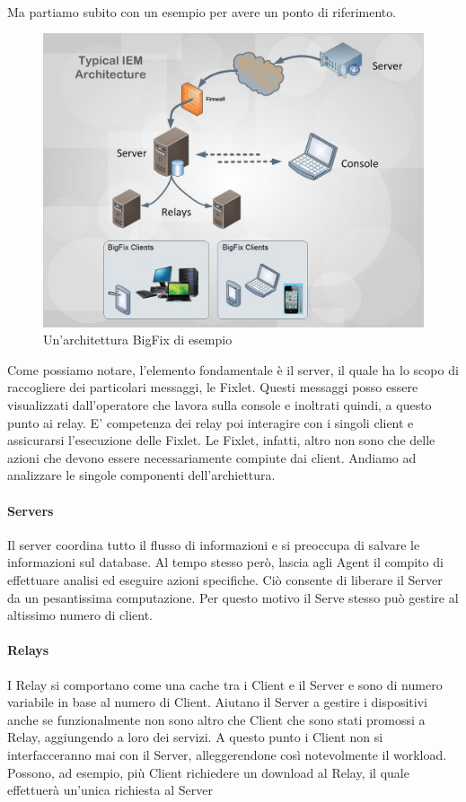\paragraph{}
Ma partiamo subito con un esempio per avere un ponto di riferimento.
\begin{figure}[h!]
	\centering
	\includegraphics[width=\textwidth,keepaspectratio=true]{capitoli/imgs/IEMArchitecture.png}
	\caption{Un'architettura BigFix di esempio}
\end{figure}
Come possiamo notare, l'elemento fondamentale è il server, il quale ha lo scopo di raccogliere dei particolari messaggi, le Fixlet. Questi messaggi posso essere visualizzati dall'operatore che lavora sulla console e inoltrati quindi, a questo punto ai relay. E' competenza dei relay poi interagire con i singoli client e assicurarsi l'esecuzione delle Fixlet. Le Fixlet, infatti, altro non sono che delle azioni che devono essere necessariamente compiute dai client.
Andiamo ad analizzare le singole componenti dell'archiettura.
\paragraph{Servers}
Il server coordina tutto il flusso di informazioni e si preoccupa di salvare le informazioni sul database. Al tempo stesso però, lascia agli Agent il compito di effettuare analisi ed eseguire azioni specifiche. Ciò consente di liberare il Server da un pesantissima computazione. Per questo motivo il Serve stesso può gestire al altissimo numero di client.
\paragraph{Relays}
I Relay si comportano come una cache tra i Client e il Server e sono di numero variabile in base al numero di Client. Aiutano il Server a gestire i dispositivi anche se funzionalmente non sono altro che Client che sono stati promossi a Relay, aggiungendo a loro dei servizi. A questo punto i Client non si interfacceranno mai con il Server, alleggerendone così notevolmente il workload. Possono, ad esempio, più Client richiedere un download al Relay, il quale effettuerà un'unica richiesta al Server
